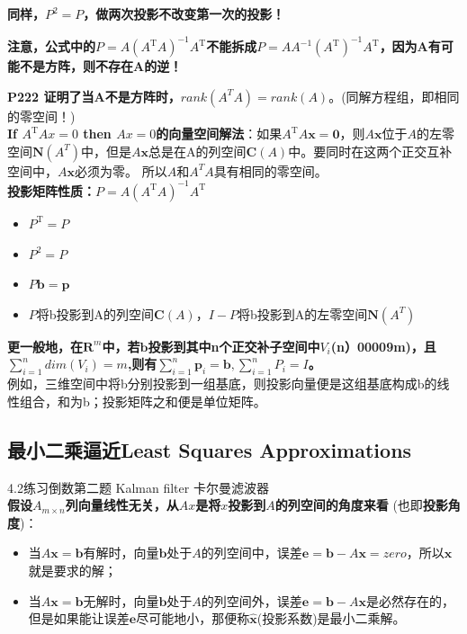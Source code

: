     \textbf{同样，$P^2=P$，做两次投影不改变第一次的投影！}

    \textbf{注意，公式中的$P=A\left(A^{\mathrm{T}} A\right)^{-1} A^{\mathrm{T}}$不能拆成$P=A A^{-1}\left(A^{\mathrm{T}}\right)^{-1} A^{\mathrm{T}}$，因为A有可能不是方阵，则不存在A的逆！}

    \textbf{P222 证明了当A不是方阵时，$rank(A^T A)=rank(A)$}。(同解方程组，即相同的零空间！) \\
    \textbf{If $A^{\mathrm{T}} A x=0$ then $A x=0$的向量空间解法}：如果$A^{\mathrm{T}} A \boldsymbol{x}=\mathbf{0}$，则$A\bm{x}$位于$A$的左零空间$\bm{N}(A^T)$中，但是$A\bm{x}$总是在A的列空间$\bm{C}(A)$中。要同时在这两个正交互补空间中，$A\bm{x}$必须为零。 所以$A$和$A^T A$具有相同的零空间。
    \\
    \textbf{投影矩阵性质：$P=A\left(A^{\mathrm{T}} A\right)^{-1} A^{\mathrm{T}}$}
    \begin{itemize}
        \item $P^{\mathrm{T}}=P$
        \item $P^{2}=P$
        \item $P \boldsymbol{b}=\boldsymbol{p}$
        \item $P$将b投影到A的列空间$\bm{C}(A)$，$I-P$将b投影到A的左零空间$\bm{N}(A^T)$
    \end{itemize}
    \textbf{更一般地，在$\bm{R}^m$中，若$\bm{b}$投影到其中n个正交补子空间中$V_i$(n）00009m)，且$\sum_{i=1}^{n}dim(V_i)=m$,则有$\sum_{i=1}^{n}\bm{p}_i=\bm{b}, \sum_{i=1}^{n}P_i=I$。}
    \\
    例如，三维空间中将b分别投影到一组基底，则投影向量便是这组基底构成b的线性组合，和为b；投影矩阵之和便是单位矩阵。

    \subsection{最小二乘逼近Least Squares Approximations}
    4.2练习倒数第二题 Kalman filter 卡尔曼滤波器\\
    \textbf{假设$A_{m\times n}$列向量线性无关，从$Ax$是将$x$投影到$A$的列空间的角度来看}
    (也即\textbf{投影角度})：
    \begin{itemize}
        \item 当$A \boldsymbol{x}=\bm{b}$有解时，向量$\bm{b}$处于$A$的列空间中，误差$\bm{e}=\bm{b}-A \bm{x}=zero$，所以$\bm{x}$就是要求的解；
        \item 当$A \boldsymbol{x}=\bm{b}$无解时，向量$\bm{b}$处于$A$的列空间外，误差$\bm{e}=\bm{b}-A \bm{x}$是必然存在的，
        但是如果能让误差$\bm{e}$尽可能地小，那便称$\hat{\bm{x}}$(投影系数)是最小二乘解。
    \end{itemize}

